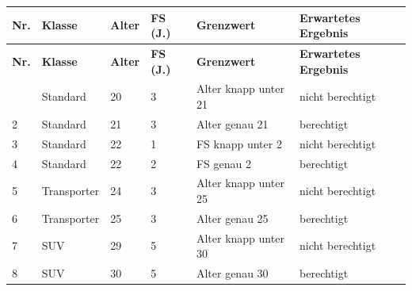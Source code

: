\documentclass[
	fontsize=12pt,          %
	paper=a4,               %
	numbers=noenddot,       %
	listof=totoc,           %
	listof=entryprefix,     %
	listof=nochaptergap,    %
	bibliography=totoc,     %
	parskip=half,           %
	openany                 %
]{scrbook}
\begin{document}
\begin{longtable}{| p{0.5cm} | p{1.9cm} | p{1.1cm} | p{1.3cm} | p{3.0cm} | p{4.3cm} |}
	\hline
	\textbf{Nr.} & \textbf{Klasse} & \textbf{Alter} & \textbf{FS (J.)} & \textbf{Grenzwert} & \textbf{Erwartetes Ergebnis} \\ \hline
	\endfirsthead
	\hline
	\textbf{Nr.} & \textbf{Klasse} & \textbf{Alter} & \textbf{FS (J.)} & \textbf{Grenzwert} & \textbf{Erwartetes Ergebnis} \\ \hline
	\endhead
	\hline
	\endfoot
	1 & Standard & 20 & 3 & Alter knapp unter 21 & nicht berechtigt \\ \hline
	2 & Standard & 21 & 3 & Alter genau 21 & berechtigt \\ \hline
	3 & Standard & 22 & 1 & FS knapp unter 2 & nicht berechtigt \\ \hline
	4 & Standard & 22 & 2 & FS genau 2 & berechtigt \\ \hline
	5 & Transporter & 24 & 3 & Alter knapp unter 25 & nicht berechtigt \\ \hline
	6 & Transporter & 25 & 3 & Alter genau 25 & berechtigt \\ \hline
	7 & SUV & 29 & 5 & Alter knapp unter 30 & nicht berechtigt \\ \hline
	8 & SUV & 30 & 5 & Alter genau 30 & berechtigt \\ \hline
\end{longtable}

\end{document}
